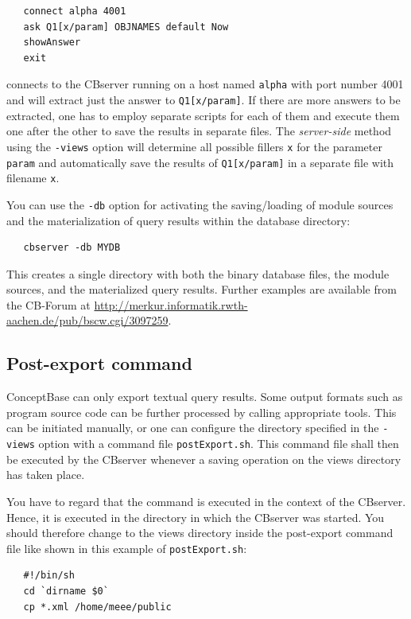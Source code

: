 \begin{verbatim}
   connect alpha 4001 
   ask Q1[x/param] OBJNAMES default Now
   showAnswer
   exit
\end{verbatim}

connects to the CBserver running on a host named {\tt alpha} with port number
4001 and will extract just the answer to {\tt Q1[x/param]}. If there are more answers to
be extracted, one has to employ separate scripts for each of them and execute them
one after the other to save the results in separate files.
The {\em server-side\/} method using the {\tt -views} option will determine
all possible fillers {\tt x} for the parameter {\tt param} and automatically save
the results of {\tt Q1[x/param]} in a separate file with filename {\tt x}.

You can use the {\tt -db} option for activating the saving/loading of module sources
and the materialization of query results within the database directory:

\begin{verbatim}
   cbserver -db MYDB 
\end{verbatim}

This creates a single directory with both the binary database files, the module sources,
and the materialized query results.
Further examples are available from the CB-Forum at \url{http://merkur.informatik.rwth-aachen.de/pub/bscw.cgi/3097259}.


\subsection{Post-export command}

ConceptBase can only export textual query results. Some output formats such as
program source code can be further processed by calling appropriate tools.
This can be initiated manually, or one can configure the directory specified
in the {\tt -views} option with a command file  {\tt postExport.sh}.
This command file shall then be executed
by the CBserver whenever a saving operation on the views directory has taken place.

You have to regard that the command is executed in the context of the CBserver.
Hence, it is executed in the directory in which the CBserver was started.
You should therefore change to the views directory inside the post-export
command file like shown in this example of {\tt postExport.sh}:

\begin{verbatim}
   #!/bin/sh
   cd `dirname $0`
   cp *.xml /home/meee/public
\end{verbatim}

